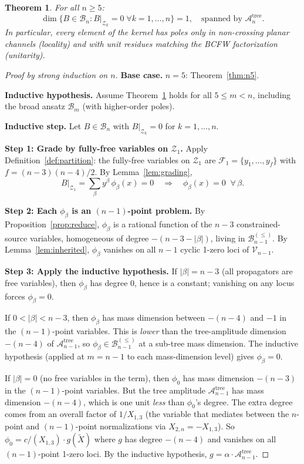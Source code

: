 \documentclass[11pt]{article}
\theoremstyle{plain}
\newtheorem{theorem}{Theorem}[section]
\theoremstyle{definition}
\newcommand{\cA}{\mathcal{A}}
\newcommand{\cB}{\mathcal{B}}
\newcommand{\cV}{\mathcal{V}}
\newcommand{\cZ}{\mathcal{Z}}
\newcommand{\cF}{\mathcal{F}}
\begin{document}
\begin{theorem}\label{thm:main}
For all $n\geq 5$:
\[
\dim\{B\in\cB_n : B|_{\cZ_k}=0\;\forall k=1,\ldots,n\} = 1,
\quad\text{spanned by } \cA_n^{\mathrm{tree}}.
\]
In particular, every element of the kernel has poles only in
non-crossing planar channels (locality) and with unit residues
matching the BCFW factorization (unitarity).
\end{theorem}

\begin{proof}[Proof by strong induction on $n$]
\textbf{Base case.} $n=5$: Theorem~\ref{thm:n5}.

\medskip\noindent\textbf{Inductive hypothesis.} Assume
Theorem~\ref{thm:main} holds for all $5\leq m < n$, including
the broad ansatz $\cB_m$ (with higher-order poles).

\medskip\noindent\textbf{Inductive step.}
Let $B\in\cB_n$ with $B|_{\cZ_k}=0$ for $k=1,\ldots,n$.

\medskip\noindent\textbf{Step 1: Grade by fully-free variables on $\cZ_1$.}
Apply Definition~\ref{def:partition}: the fully-free variables
on $\cZ_1$ are $\cF_1 = \{y_1,\ldots,y_f\}$ with
$f=(n{-}3)(n{-}4)/2$. By Lemma~\ref{lem:grading},
\[
B\big|_{\cZ_1} = \sum_\beta y^\beta\,\phi_\beta(x) = 0
\quad\Longrightarrow\quad
\phi_\beta(x) = 0 \;\;\forall\,\beta.
\]

\noindent\textbf{Step 2: Each $\phi_\beta$ is an $(n{-}1)$-point problem.}
By Proposition~\ref{prop:reduce}, $\phi_\beta$ is a rational
function of the $n{-}3$ constrained-source variables, homogeneous
of degree $-(n{-}3{-}|\beta|)$, living in $\cB_{n-1}^{(\leq)}$.
By Lemma~\ref{lem:inherited}, $\phi_\beta$ vanishes on all
$n{-}1$ cyclic 1-zero loci of $\cV_{n-1}$.

\medskip\noindent\textbf{Step 3: Apply the inductive hypothesis.}
If $|\beta| = n{-}3$ (all propagators are free variables), then
$\phi_\beta$ has degree $0$, hence is a constant; vanishing on any
locus forces $\phi_\beta = 0$.

If $0 < |\beta| < n{-}3$, then $\phi_\beta$ has mass dimension
between $-(n{-}4)$ and $-1$ in the $(n{-}1)$-point variables.
This is \emph{lower} than the tree-amplitude dimension $-(n{-}4)$
of $\cA_{n-1}^{\mathrm{tree}}$, so $\phi_\beta\in\cB_{n-1}^{(\leq)}$
at a sub-tree mass dimension. The inductive hypothesis (applied
at $m=n{-}1$ to each mass-dimension level) gives $\phi_\beta = 0$.

If $|\beta|=0$ (no free variables in the term), then $\phi_0$ has
mass dimension $-(n{-}3)$ in the $(n{-}1)$-point variables. But
the tree amplitude $\cA_{n-1}^{\mathrm{tree}}$ has mass dimension
$-(n{-}4)$, which is one unit \emph{less} than $\phi_0$'s degree.
The extra degree comes from an overall factor of $1/X_{1,3}$
(the variable that mediates between the $n$-point and
$(n{-}1)$-point normalizations via $X_{2,n}=-X_{1,3}$). So
$\phi_0 = c/(X_{1,3})\cdot g(\widetilde{X})$ where $g$ has
degree $-(n{-}4)$ and vanishes on all $(n{-}1)$-point 1-zero loci.
By the inductive hypothesis, $g = \alpha\cdot\cA_{n-1}^{\mathrm{tree}}$.


\end{proof}
\end{document}
